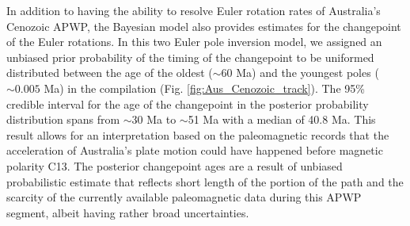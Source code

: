 \documentclass[11pt,letterpaper]{article}
\begin{document}
In addition to having the ability to resolve Euler rotation rates of Australia's Cenozoic APWP, the Bayesian model also provides estimates for the changepoint of the Euler rotations. In this two Euler pole inversion model, we assigned an unbiased prior probability of the timing of the changepoint to be uniformed distributed between the age of the oldest ($\sim60$ Ma) and the youngest poles ($\sim0.005$ Ma) in the compilation (Fig. \ref{fig:Aus_Cenozoic_track}). The 95\% credible interval for the age of the changepoint in the posterior probability distribution spans from $\sim$30 Ma to $\sim$51 Ma with a median of 40.8 Ma. This result allows for an interpretation based on the paleomagnetic records that the acceleration of Australia's plate motion could have happened before magnetic polarity C13. The posterior changepoint ages are a result of unbiased probabilistic estimate that reflects short length of the portion of the path and the scarcity of the currently available paleomagnetic data during this APWP segment, albeit having rather broad uncertainties. 
\end{document}
